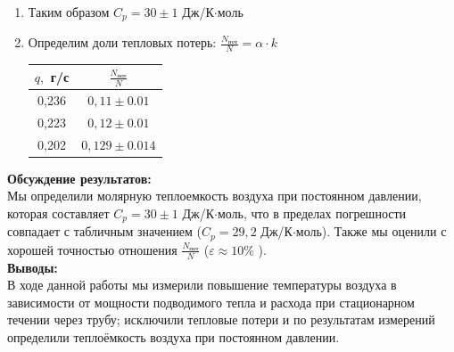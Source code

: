 \documentclass[a4paper, 12pt]{article}%
\begin{document}
\begin{enumerate}
	\begin{figure}[h]
	\end{figure}
	
	\item Таким образом $C_p = 30 \pm 1$ Дж/К$\cdot$моль
	\item Определим доли тепловых потерь: $\frac{N_{\text{пот}}}{N} =\alpha \cdot k$
	\begin{longtable}{|c|c|}
	\hline
	$q,$ г/с & $\frac{N_{\text{пот}}}{N}$ \\
	\hline
	0,236 & $0,11 \pm 0.01$ \\
	\hline
    0,223 & $0,12 \pm 0.01$\\
	\hline
    0,202 & $0,129 \pm 0.014$ \\
	\hline
	\end{longtable}
\end{enumerate}
	\textbf{Обсуждение результатов: }\\
	Мы определили молярную теплоемкость воздуха при постоянном давлении, которая составляет  $C_p = 30 \pm 1$ Дж/К$\cdot$моль, что в пределах погрешности совпадает с табличным значением ($C_p = 29,2$ Дж/К$\cdot$моль). Также мы оценили с хорошей точностью отношения $\frac{N_{\text{пот}}}{N}$ ($\varepsilon \approx 10 \% $ ).\\
	
	
	\textbf{Выводы: }\\
	В ходе данной работы мы измерили повышение температуры воздуха в зависимости от мощности подводимого тепла и расхода при стационарном течении через трубу; исключили тепловые потери и по результатам измерений определили теплоёмкость воздуха при постоянном давлении.
	
\end{document}
